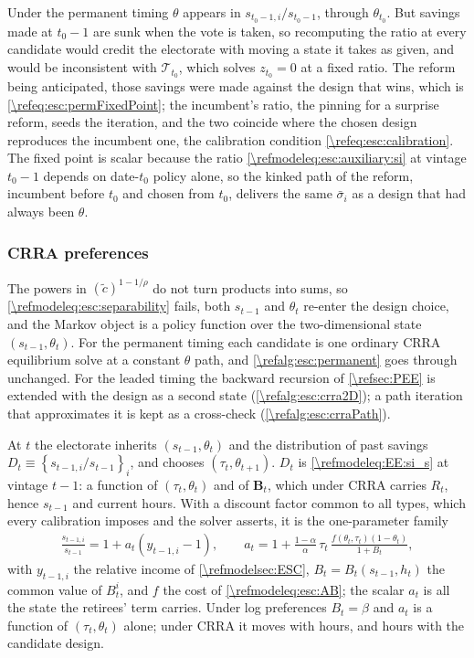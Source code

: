  Under the permanent timing $\theta$ appears in $s_{t_0-1,i}/s_{t_0-1}$, through $\theta_{t_0}$. But savings made at $t_0-1$ are sunk when the vote is taken, so recomputing the ratio at every candidate would credit the electorate with moving a state it takes as given, and would be inconsistent with $\mathcal{T}_{t_0}$, which solves $z_{t_0}=0$ at a fixed ratio. The reform being anticipated, those savings were made against the design that wins, which is \eqref{\refeq:esc:permFixedPoint}; the incumbent's ratio, the pinning for a surprise reform, seeds the iteration, and the two coincide where the chosen design reproduces the incumbent one, the calibration condition \eqref{\refeq:esc:calibration}. The fixed point is scalar because the ratio \eqref{\refmodeleq:esc:auxiliary:si} at vintage $t_0-1$ depends on date-$t_0$ policy alone, so the kinked path of the reform, incumbent before $t_0$ and chosen from $t_0$, delivers the same $\bar{\sigma}_i$ as a design that had always been $\theta$.


\subsubsection{CRRA preferences}\label{\refsec:ESC:crra}
The powers in $\left(\tilde{c}\right)^{1-1/\rho}$ do not turn products into sums, so \eqref{\refmodeleq:esc:separability} fails, both $s_{t-1}$ and $\theta_t$ re-enter the design choice, and the Markov object is a policy function over the two-dimensional state $\left(s_{t-1},\theta_t\right)$. For the permanent timing each candidate is one ordinary CRRA equilibrium solve at a constant $\theta$ path, and \cref{\refalg:esc:permanent} goes through unchanged. For the leaded timing the backward recursion of \cref{\refsec:PEE} is extended with the design as a second state (\cref{\refalg:esc:crra2D}); a path iteration that approximates it is kept as a cross-check (\cref{\refalg:esc:crraPath}).

 At $t$ the electorate inherits $\left(s_{t-1},\theta_t\right)$ and the distribution of past savings $D_t\equiv\left\lbrace s_{t-1,i}/s_{t-1}\right\rbrace_i$, and chooses $\left(\tau_t,\theta_{t+1}\right)$. $D_t$ is \eqref{\refmodeleq:EE:si_s} at vintage $t-1$: a function of $\left(\tau_t,\theta_t\right)$ and of $\bm{B}_t$, which under CRRA carries $R_t$, hence $s_{t-1}$ and current hours. With a discount factor common to all types, which every calibration imposes and the solver asserts, it is the one-parameter family
\begin{align}\label{\refeq:esc:aDef}
    \frac{s_{t-1,i}}{s_{t-1}} = 1 + a_t\left(y_{t-1,i}-1\right), \qquad a_t = 1+\frac{1-\alpha}{\alpha}\,\tau_t\,\frac{f\left(\theta_t,\tau_t\right)\left(1-\theta_t\right)}{1+B_t},
\end{align}
with $y_{t-1,i}$ the relative income of \cref{\refmodelsec:ESC}, $B_t = B_t\left(s_{t-1},h_t\right)$ the common value of $B_t^i$, and $f$ the cost of \eqref{\refmodeleq:esc:AB}; the scalar $a_t$ is all the state the retirees' term carries. Under log preferences $B_t=\beta$ and $a_t$ is a function of $\left(\tau_t,\theta_t\right)$ alone; under CRRA it moves with hours, and hours with the candidate design.

